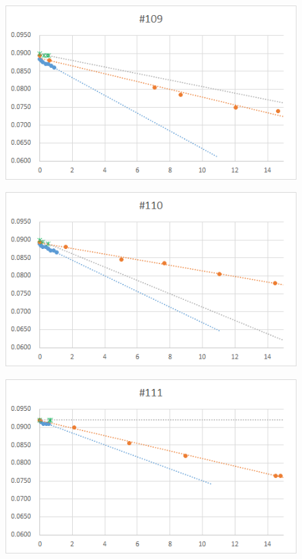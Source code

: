   \begin{figure}[htbp]
    \centering
       \includegraphics[width=120mm]{vol_109.png}
  \end{figure}
  \begin{figure}[htbp]
    \centering
       \includegraphics[width=120mm]{vol_110.png}
  \end{figure}
  \begin{figure}[htbp]
    \centering
       \includegraphics[width=120mm]{vol_111.png}
  \end{figure}
